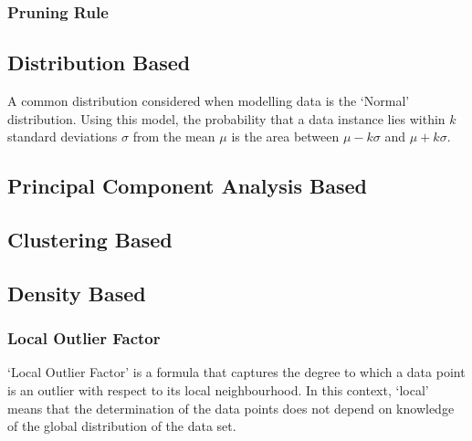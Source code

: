\subsubsection{Pruning Rule}
\label{anomalyDetection:approaches:distance:pruning}

\subsection{Distribution Based}
\label{anomalyDetection:approaches:distribution}
A common distribution considered when modelling data is the `Normal'
distribution. Using this model, the probability that a data instance lies within
$k$ standard deviations $\sigma$ from the mean $\mu$ is the area between
$\mu - k\sigma$ and $\mu + k\sigma$.

\subsection{Principal Component Analysis Based}
\label{anomalyDetection:pca}

\subsection{Clustering Based}
\label{anomalyDetection:clustering}

\subsection{Density Based}
\label{anomalyDetection:density}

\subsubsection{Local Outlier Factor}
\label{localOutlierFactor}
`Local Outlier Factor' is a formula that captures the degree to which a data
point is an outlier with respect to its local neighbourhood. In this context,
`local' means that the determination of the data points does not depend on
knowledge of the global distribution of the data set.
